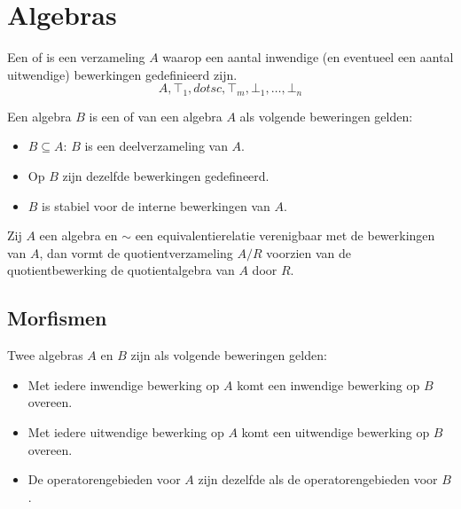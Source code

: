 \documentclass[main.tex]{subfiles}
\begin{document}
\chapter{Algebras}
\label{cha:algebras}

\begin{de}
  \label{de:algebra}
  Een  of  is een verzameling $A$ waarop een aantal inwendige (en eventueel een aantal uitwendige) bewerkingen gedefinieerd zijn.
  \[ A,\top_{1},dotsc,\top_{m},\bot_{1},\dotsc,\bot_{n} \]
\end{de}

\begin{de}
  Een algebra $B$ is een  of  van een algebra $A$ als volgende beweringen gelden:
  \begin{itemize}
  \item $B \subseteq A$: $B$ is een deelverzameling van $A$.
  \item Op $B$ zijn dezelfde bewerkingen gedefineerd.
  \item $B$ is stabiel voor de interne bewerkingen van $A$.
  \end{itemize}
\end{de}

\begin{de}
  Zij $A$ een algebra en $\sim$ een equivalentierelatie verenigbaar met de bewerkingen van $A$, dan vormt de quotientverzameling $A/R$ voorzien van de quotientbewerking de quotientalgebra van $A$ door $R$.
\end{de}

\section{Morfismen}
\label{sec:morfismen}

\begin{de}
  Twee algebras $A$ en $B$ zijn  als volgende beweringen gelden:
  \begin{itemize}
  \item Met iedere inwendige bewerking op $A$ komt een inwendige bewerking op $B$ overeen. 
  \item Met iedere uitwendige bewerking op $A$ komt een uitwendige bewerking op $B$ overeen.
  \item De operatorengebieden voor $A$ zijn dezelfde als de operatorengebieden voor $B$.
  \end{itemize}
\end{de}
\end{document}
